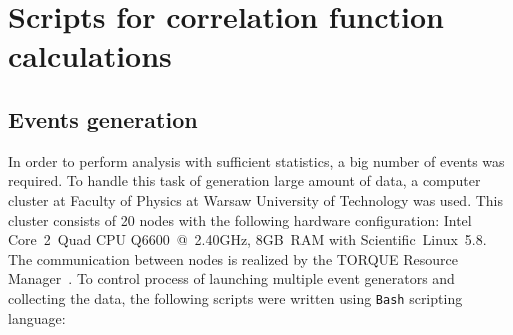 %
\chapter{Scripts for correlation function calculations}
\label{a:a}
  \section{Events generation}
    In order to perform analysis with sufficient statistics, a big number of events was required.
    To handle this task of generation large amount of data, a computer cluster at Faculty of Physics at Warsaw University of Technology was used.
    This cluster consists of 20 nodes with the following hardware configuration: \mbox{Intel\textregistered} \mbox{Core\texttrademark~2 Quad} CPU \mbox{Q6600 @ 2.40GHz,} \mbox{8GB RAM} with Scientific~Linux~5.8.
    The communication between nodes is realized by the TORQUE Resource Manager~\cite{torque}.
    To control process of launching multiple event generators and collecting the data, the following scripts were written using \verb|Bash| scripting language:
